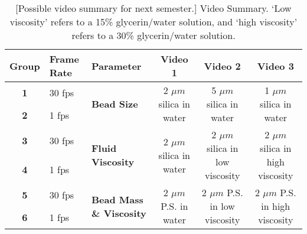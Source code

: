 \begin{table}[h]
\centering
\begin{tabular}{|c|p{1.5cm}|p{2.4cm}|c|c|c|}
\hline
\textbf{Group} & \textbf{Frame Rate} & \textbf{Parameter} & \textbf{Video 1} & \textbf{Video 2} & \textbf{Video 3} \\ \hline
\textbf{1} & 30 fps & \multirow{2}{2.4cm}{\textbf{Bead Size}} & \multirow{2}{2.3cm}{2 $\mu m$ silica in water} & \multirow{2}{3cm}{5 $\mu m$ silica in water} & \multirow{2}{3cm}{1 $\mu m$ silica in water} \\ \cline{1-2}
\textbf{2} & 1 fps &  &  &  &  \\ \hline
\textbf{3} & 30 fps  & \multirow{2}{2.4cm}{\textbf{Fluid Viscosity}} & \multirow{2}{2.3cm}{2 $\mu m$ silica in water} & \multirow{2}{3cm}{2 $\mu m$ silica in low viscosity} & \multirow{2}{3cm}{2 $\mu m$ silica in high viscosity} \\ \cline{1-2}
\textbf{4} & 1 fps & & & & \\ \hline
\textbf{5} & 30 fps & \multirow{2}{2.4cm}{\textbf{Bead Mass \& Viscosity}} & \multirow{2}{2.2cm}{2 $\mu m$ P.S. in water} & \multirow{2}{2.8cm}{2 $\mu m$ P.S. in low viscosity} & \multirow{2}{3cm}{2 $\mu m$ P.S. in high viscosity} \\ \cline{1-2}
\textbf{6} & 1 fps & & & & \\ \hline
\end{tabular}
\caption{[Possible video summary for next semester.] Video Summary. `Low viscosity' refers to a 15\% glycerin/water solution, and `high viscosity' refers to a 30\% glycerin/water solution.}
\label{tab:exp3video_v2}
\end{table}

